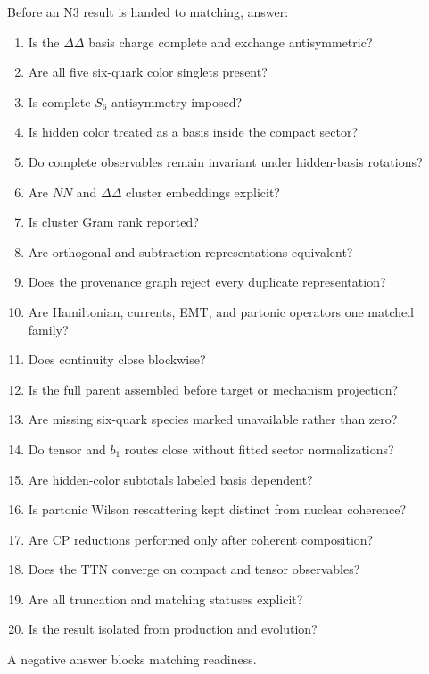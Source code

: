 \documentclass[11pt]{article}
\begin{document}
Before an N3 result is handed to matching, answer:
\begin{enumerate}
\item Is the \(\Delta\Delta\) basis charge complete and exchange antisymmetric?
\item Are all five six-quark color singlets present?
\item Is complete \(S_6\) antisymmetry imposed?
\item Is hidden color treated as a basis inside the compact sector?
\item Do complete observables remain invariant under hidden-basis rotations?
\item Are \(NN\) and \(\Delta\Delta\) cluster embeddings explicit?
\item Is cluster Gram rank reported?
\item Are orthogonal and subtraction representations equivalent?
\item Does the provenance graph reject every duplicate representation?
\item Are Hamiltonian, currents, EMT, and partonic operators one matched family?
\item Does continuity close blockwise?
\item Is the full parent assembled before target or mechanism projection?
\item Are missing six-quark species marked unavailable rather than zero?
\item Do tensor and \(b_1\) routes close without fitted sector normalizations?
\item Are hidden-color subtotals labeled basis dependent?
\item Is partonic Wilson rescattering kept distinct from nuclear coherence?
\item Are CP reductions performed only after coherent composition?
\item Does the TTN converge on compact and tensor observables?
\item Are all truncation and matching statuses explicit?
\item Is the result isolated from production and evolution?
\end{enumerate}
A negative answer blocks matching readiness.
\end{document}
